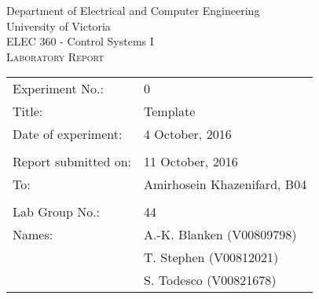 \begin{titlepage}

\begin{center}
	\begin{LARGE}
		Department of Electrical and Computer Engineering \\
		University of Victoria \\
		ELEC 360 - Control Systems I \\[1cm]
		\textsc{Laboratory Report}
		\\[1cm]
	\end{LARGE}
\end{center}

\begin{tabular}{ p{} p{} }
	Experiment No.: & 0 \\ 
	Title: & Template \\ 
	Date of experiment:& 4 October, 2016 \\ 
	& \\
	Report submitted on:& 11 October, 2016 \\ 
	To: & Amirhosein Khazenifard, B04 \\ 
	& \\
  Lab Group No.: & 44 \\
	Names: & A.-K. Blanken (V00809798)\\
	& T. Stephen (V00812021) \\
  & S. Todesco (V00821678)
\end{tabular}

\end{titlepage}
